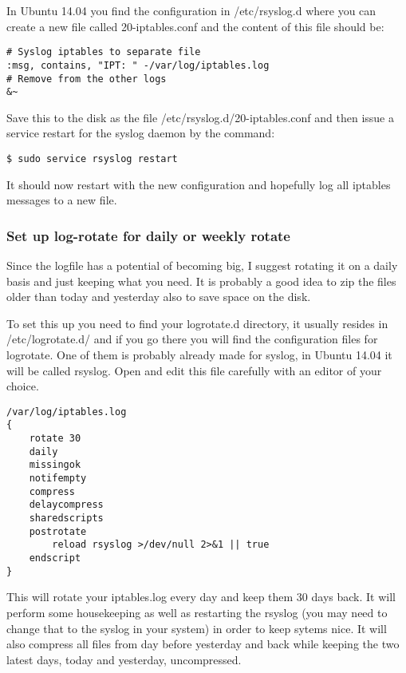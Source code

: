 \documentclass[english,twoside,openright,a4paper,12pt]{article}
\begin{document}
In Ubuntu 14.04 you find the configuration in /etc/rsyslog.d where you
can create a new file called 20-iptables.conf and the content of this
file should be:

\begin{verbatim}
# Syslog iptables to separate file
:msg, contains, "IPT: " -/var/log/iptables.log 
# Remove from the other logs
&~
\end{verbatim}

Save this to the disk as the file /etc/rsyslog.d/20-iptables.conf and
then issue a service restart for the syslog daemon by the command:

\begin{verbatim}
$ sudo service rsyslog restart
\end{verbatim}

It should now restart with the new configuration and hopefully log all
iptables messages to a new file.

\subsubsection{Set up log-rotate for daily or weekly rotate}

Since the logfile has a potential of becoming big, I suggest rotating
it on a daily basis and just keeping what you need. It is probably a
good idea to zip the files older than today and yesterday also to save
space on the disk.

To set this up you need to find your logrotate.d directory, it usually
resides in /etc/logrotate.d/ and if you go there you will find the
configuration files for logrotate. One of them is probably already
made for syslog, in Ubuntu 14.04 it will be called rsyslog. Open and
edit this file carefully with an editor of your choice.

\begin{verbatim}
/var/log/iptables.log
{
    rotate 30
    daily 
    missingok 
    notifempty 
    compress 
    delaycompress 
    sharedscripts 
    postrotate 
        reload rsyslog >/dev/null 2>&1 || true 
    endscript
}
\end{verbatim}

This will rotate your iptables.log every day and keep them 30 days
back. It will perform some housekeeping as well as restarting the
rsyslog (you may need to change that to the syslog in your system) in
order to keep sytems nice. It will also compress all files from day
before yesterday and back while keeping the two latest days, today and
yesterday, uncompressed.
\end{document}
